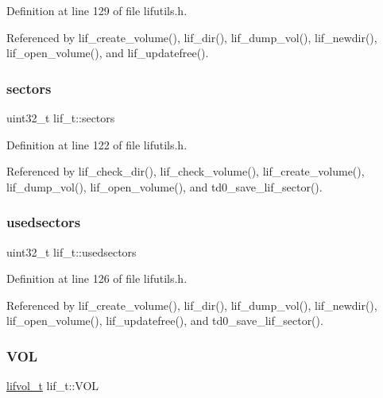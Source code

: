 Definition at line 129 of file lifutils.\+h.



Referenced by lif\+\_\+create\+\_\+volume(), lif\+\_\+dir(), lif\+\_\+dump\+\_\+vol(), lif\+\_\+newdir(), lif\+\_\+open\+\_\+volume(), and lif\+\_\+updatefree().

\mbox{\label{structlif__t_a262b14d8547abff49d9dd1b445faf6d5}} 
\subsubsection{\texorpdfstring{sectors}{sectors}}
{\footnotesize\ttfamily uint32\+\_\+t lif\+\_\+t\+::sectors}



Definition at line 122 of file lifutils.\+h.



Referenced by lif\+\_\+check\+\_\+dir(), lif\+\_\+check\+\_\+volume(), lif\+\_\+create\+\_\+volume(), lif\+\_\+dump\+\_\+vol(), lif\+\_\+open\+\_\+volume(), and td0\+\_\+save\+\_\+lif\+\_\+sector().

\mbox{\label{structlif__t_ad81767a2f65b997d5abecba130b89814}} 
\subsubsection{\texorpdfstring{usedsectors}{usedsectors}}
{\footnotesize\ttfamily uint32\+\_\+t lif\+\_\+t\+::usedsectors}



Definition at line 126 of file lifutils.\+h.



Referenced by lif\+\_\+create\+\_\+volume(), lif\+\_\+dir(), lif\+\_\+dump\+\_\+vol(), lif\+\_\+newdir(), lif\+\_\+open\+\_\+volume(), lif\+\_\+updatefree(), and td0\+\_\+save\+\_\+lif\+\_\+sector().

\mbox{\label{structlif__t_ae68126d2b9261ef9a6903a95d5c82cac}} 
\subsubsection{\texorpdfstring{V\+OL}{VOL}}
{\footnotesize\ttfamily \hyperlink{structlifvol__t}{lifvol\+\_\+t} lif\+\_\+t\+::\+V\+OL}




